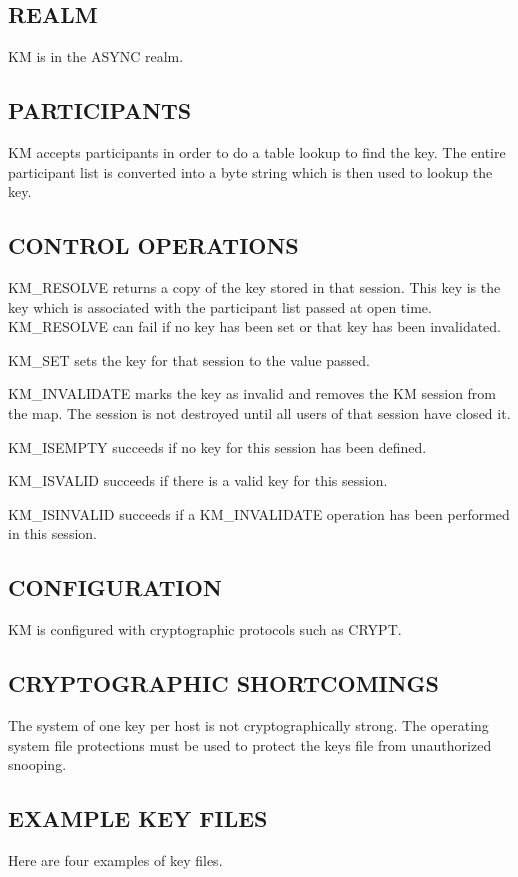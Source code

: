 \noindent 
\subsection*{REALM}

KM is in the ASYNC realm.

\subsection*{PARTICIPANTS}

KM accepts participants in order to do a table lookup to find 
the key. The entire participant list is converted into a byte 
string which is then used to lookup the key. 

\subsection*{CONTROL OPERATIONS}
KM\_RESOLVE returns a copy of the key stored in that session. 
This key is the key which is associated with the participant 
list passed at open time. KM\_RESOLVE can fail if no key has
been set or that key has been invalidated.

KM\_SET sets the key for that session to the value passed.

KM\_INVALIDATE marks the key as invalid and removes the KM 
session from the map. The session is not destroyed until all 
users of that session have closed it. 

KM\_ISEMPTY succeeds if no key for this session has been 
defined.  

KM\_ISVALID succeeds if there is a valid key for this session. 

KM\_ISINVALID succeeds if a KM\_INVALIDATE operation has 
been performed in this session. 

\subsection*{CONFIGURATION}

KM is configured with cryptographic protocols such as CRYPT. 

\subsection*{CRYPTOGRAPHIC SHORTCOMINGS}
The system of one key per host is not cryptographically strong. 
The operating system file protections must be used to protect 
the keys file from unauthorized snooping.

\subsection*{EXAMPLE KEY FILES}
Here are four examples of key files.

